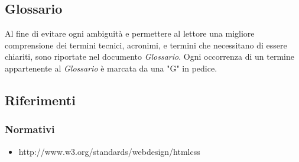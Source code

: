 \subsection{Glossario}
Al fine di evitare ogni ambiguità e permettere al lettore una migliore comprensione dei termini tecnici, acronimi, e termini che necessitano di essere chiariti,  sono riportate nel documento \textit{Glossario}. 
Ogni occorrenza  di un termine appartenente al \textit{Glossario} è marcata da una "G" in pedice.

\subsection{Riferimenti}

\subsubsection{Normativi}

\begin{itemize}
	\item http://www.w3.org/standards/webdesign/htmlcss
\end{itemize}